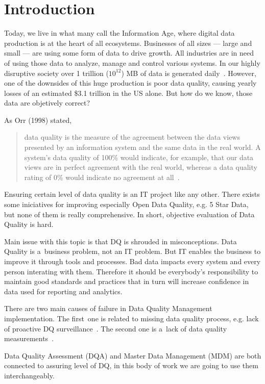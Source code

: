 \chapter{Introduction}\label{ch:introduction}

Today, we live in what many call the Information Age, where digital data production is at the heart of all ecosystems.
Businesses of all sizes — large and small — are using some form of data to drive growth.
All industries are in need of using those data to analyze, manage and control various systems.
In our highly disruptive society over 1 trillion (\( 10^{12} \)) MB of data is generated daily~\cite{techjury2021}.
However, one of the downsides of this huge production is poor data quality, causing yearly losses of an estimated \$3.1 trillion in the US alone.
But how do we know, those data are objetively correct?

As Orr (1998) stated,
\blockquote[][]{data quality is the measure of the agreement between the data views presented by an information system and the same data in the real world.
A system's data quality of 100\% would indicate, for example, that our data views are in perfect agreement with the real world, whereas a data quality rating of 0\% would indicate no agreement at all~\cite{orr1998}.}

Ensuring certain level of data quality is an IT project like any other.
There exists some iniciatives for improving especially Open Data Quality, e.g. 5 Star Data, but none of them is really comprehensive.
In short, objective evaluation of Data Quality is hard.

Main issue with this topic is that DQ is shrouded in misconceptions.
Data Quality is a~business problem, not an IT problem.
But IT enables the business to improve it through tools and processes.
Bad data impacts every system and every person interating with them.
Therefore it should be everybody's responsibility to maintain good standards and practices that in turn will increase confidence in data used for reporting and analytics.

There are two main causes of failure in Data Quality Management implementation.
The first~one is related to missing data quality process, e.g. lack of proactive DQ surveillance~\cite{risto2011}.
The second one is a~lack of data quality measurements~\cite{haug2013}.

Data Quality Assessment (DQA) and Master Data Management (MDM) are both connected to assuring level of DQ, in this body of work we are going to use them interchangeably.


